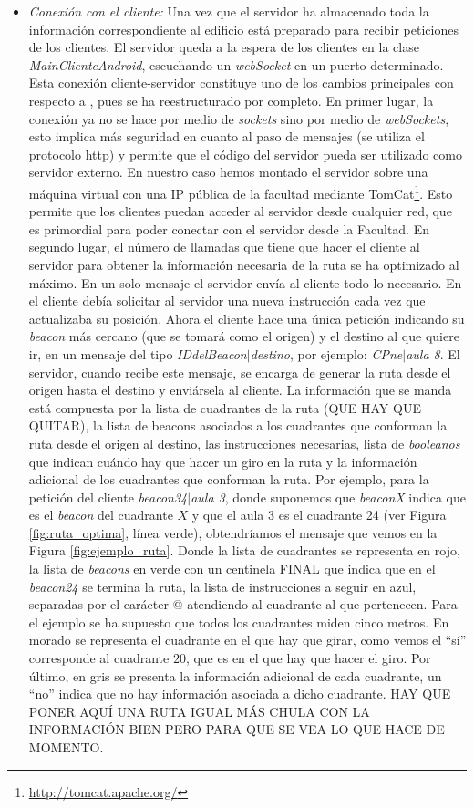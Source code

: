 \begin{itemize}
	\item \textit{Conexión con el cliente:} Una vez que el servidor ha almacenado toda la información correspondiente al edificio está preparado para recibir peticiones de los clientes. El servidor queda a la espera de los clientes en la clase \textit{MainClienteAndroid}, escuchando un \textit{webSocket} en un puerto determinado. Esta conexión cliente-servidor constituye uno de los cambios principales con respecto a \cite{TFGguia}, pues se ha reestructurado por completo. En primer lugar, la conexión ya no se hace por medio de \textit{sockets} sino por medio de \textit{webSockets}, esto implica más seguridad en cuanto al paso de mensajes (se utiliza el protocolo http) y permite que el código del servidor pueda ser utilizado como servidor externo. En nuestro caso hemos montado el servidor sobre una máquina virtual con una IP pública de la facultad mediante TomCat\footnote{\url{http://tomcat.apache.org/}}. Esto permite que los clientes puedan acceder al servidor desde cualquier red, que es primordial para poder conectar con el servidor desde la Facultad. En segundo lugar, el número de llamadas que tiene que hacer el cliente al servidor para obtener la información necesaria de la ruta se ha optimizado al máximo. En un solo mensaje el servidor envía al cliente todo lo necesario. En \cite{TFGguia} el cliente debía solicitar al servidor una nueva instrucción cada vez que actualizaba su posición. Ahora el cliente hace una única petición indicando su \textit{beacon} más cercano (que se tomará como el origen) y el destino al que quiere ir, en un mensaje del tipo \textit{IDdelBeacon$|$destino}, por ejemplo: \textit{CPne$|$aula 8}. El servidor, cuando recibe este mensaje, se encarga de generar la ruta desde el origen hasta el destino y enviársela al cliente. La información que se manda está compuesta por la lista de cuadrantes de la ruta (QUE HAY QUE QUITAR), la lista de beacons asociados a los cuadrantes que conforman la ruta desde el origen al destino, las instrucciones necesarias, lista de \textit{booleanos} que indican cuándo hay que hacer un giro en la ruta y la información adicional de los cuadrantes que conforman la ruta. Por ejemplo, para la petición del cliente \textit{beacon34$|$aula 3}, donde suponemos que \textit{beaconX} indica que es el \textit{beacon} del cuadrante $X$ y que el aula 3 es el cuadrante 24 (ver Figura \ref{fig:ruta_optima}, línea verde), obtendríamos el mensaje que vemos en la Figura \ref{fig:ejemplo_ruta}. Donde la lista de cuadrantes se representa en rojo, la lista de \textit{beacons} en verde con un centinela FINAL que indica que en el \textit{beacon24} se termina la ruta, la lista de instrucciones a seguir en azul, separadas por el carácter @ atendiendo al cuadrante al que pertenecen. Para el ejemplo se ha supuesto que todos los cuadrantes miden cinco metros. En morado se representa el cuadrante en el que hay que girar, como vemos el ``sí'' corresponde al cuadrante $20$, que es en el que hay que hacer el giro. Por último, en gris se presenta la información adicional de cada cuadrante, un ``no'' indica que no hay información asociada a dicho cuadrante. HAY QUE PONER AQUÍ UNA RUTA IGUAL MÁS CHULA CON LA INFORMACIÓN BIEN PERO PARA QUE SE VEA LO QUE HACE DE MOMENTO.
	

\end{itemize}
